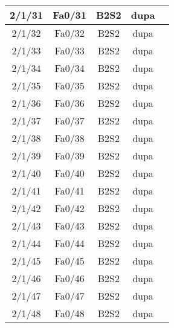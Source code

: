 \begin{center}
\begin{longtable}{|c|c|c|c|c|}
	2/1/31 & Fa0/31 & B2S2 & dupa \\ \hline
	2/1/32 & Fa0/32 & B2S2 & dupa \\ \hline
	2/1/33 & Fa0/33 & B2S2 & dupa \\ \hline
	2/1/34 & Fa0/34 & B2S2 & dupa \\ \hline
	2/1/35 & Fa0/35 & B2S2 & dupa \\ \hline
	2/1/36 & Fa0/36 & B2S2 & dupa \\ \hline
	2/1/37 & Fa0/37 & B2S2 & dupa \\ \hline
	2/1/38 & Fa0/38 & B2S2 & dupa \\ \hline
	2/1/39 & Fa0/39 & B2S2 & dupa \\ \hline
	2/1/40 & Fa0/40 & B2S2 & dupa \\ \hline
	2/1/41 & Fa0/41 & B2S2 & dupa \\ \hline
	2/1/42 & Fa0/42 & B2S2 & dupa \\ \hline
	2/1/43 & Fa0/43 & B2S2 & dupa \\ \hline
	2/1/44 & Fa0/44 & B2S2 & dupa \\ \hline
	2/1/45 & Fa0/45 & B2S2 & dupa \\ \hline
	2/1/46 & Fa0/46 & B2S2 & dupa \\ \hline
	2/1/47 & Fa0/47 & B2S2 & dupa \\ \hline
	2/1/48 & Fa0/48 & B2S2 & dupa \\ \hline
    \end{longtable}
\end{center}

